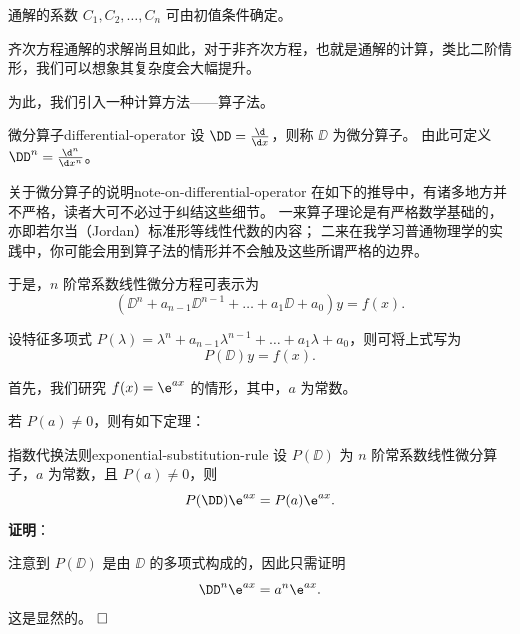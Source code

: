 通解的系数 $ C_1 , C_2 , \ldots , C_n $ 可由初值条件确定。

\bigskip

齐次方程通解的求解尚且如此，对于非齐次方程，也就是通解的计算，类比二阶情形，我们可以想象其复杂度会大幅提升。

为此，我们引入一种计算方法——算子法。

\begin{definition}{微分算子}{differential-operator}
    设 $ \DD = \frac{\d}{\d x} $，则称 $ \DD $ 为微分算子。
    由此可定义 $ \DD^n = \frac{\d^n}{\d x^n} $。
\end{definition}

\begin{note}{关于微分算子的说明}{note-on-differential-operator}
    在如下的推导中，有诸多地方并不严格，读者大可不必过于纠结这些细节。
    一来算子理论是有严格数学基础的，亦即若尔当（Jordan）标准形等线性代数的内容；
    二来在我学习普通物理学的实践中，你可能会用到算子法的情形并不会触及这些所谓严格的边界。
\end{note}

于是，$ n $ 阶常系数线性微分方程可表示为
\begin{equation}
    (\DD^n + a_{n-1} \DD^{n-1} + \ldots + a_1 \DD + a_0) y = f(x) .
\end{equation}

设特征多项式 $ P(\lambda) = \lambda^n + a_{n-1} \lambda^{n-1} + \ldots + a_1 \lambda + a_0 $，则可将上式写为
\begin{equation}
    P(\DD) y = f(x) .
\end{equation}

首先，我们研究 $ f(x) = \e^{ax} $ 的情形，其中，$ a $ 为常数。

若 $ P(a) \neq 0 $，则有如下定理：
\begin{theorem}{指数代换法则}{exponential-substitution-rule}
    设 $ P(\DD) $ 为 $ n $ 阶常系数线性微分算子，$ a $ 为常数，且 $ P(a) \neq 0 $，则
    \begin{equation}
        P(\DD) \e^{ax} = P(a) \e^{ax} .
    \end{equation}
    \textbf{证明}：

    注意到 $ P(\DD) $ 是由 $ \DD $ 的多项式构成的，因此只需证明
    \begin{equation*}
        \DD^n \e^{ax} = a^n \e^{ax} .
    \end{equation*}
    这是显然的。
    $\hfill\square$
\end{theorem}

